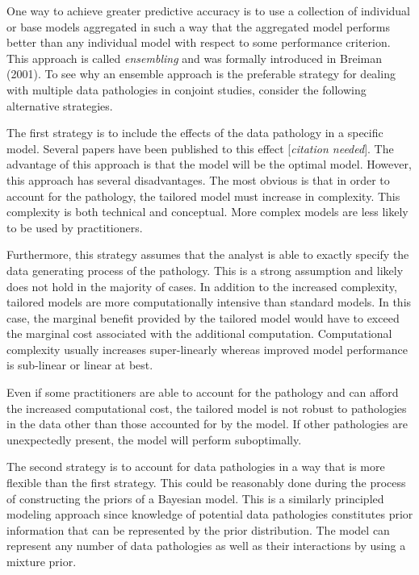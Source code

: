 \documentclass[12pt,titlepage]{mktg-article}
\begin{document}
One way to achieve greater predictive accuracy is to use a collection of individual or base models aggregated in such a way that the aggregated model performs better than any individual model with respect to some performance criterion. This approach is called \emph{ensembling} and was formally introduced in Breiman (2001). To see why an ensemble approach is the preferable strategy for dealing with multiple data pathologies in conjoint studies, consider the following alternative strategies.

The first strategy is to include the effects of the data pathology in a specific model. Several papers have been published to this effect {[}\emph{citation needed}{]}. The advantage of this approach is that the model will be the optimal model. However, this approach has several disadvantages. The most obvious is that in order to account for the pathology, the tailored model must increase in complexity. This complexity is both technical and conceptual. More complex models are less likely to be used by practitioners.

Furthermore, this strategy assumes that the analyst is able to exactly specify the data generating process of the pathology. This is a strong assumption and likely does not hold in the majority of cases. In addition to the increased complexity, tailored models are more computationally intensive than standard models. In this case, the marginal benefit provided by the tailored model would have to exceed the marginal cost associated with the additional computation. Computational complexity usually increases super-linearly whereas improved model performance is sub-linear or linear at best.

Even if some practitioners are able to account for the pathology and can afford the increased computational cost, the tailored model is not robust to pathologies in the data other than those accounted for by the model. If other pathologies are unexpectedly present, the model will perform suboptimally.

The second strategy is to account for data pathologies in a way that is more flexible than the first strategy. This could be reasonably done during the process of constructing the priors of a Bayesian model. This is a similarly principled modeling approach since knowledge of potential data pathologies constitutes prior information that can be represented by the prior distribution. The model can represent any number of data pathologies as well as their interactions by using a mixture prior.
\end{document}
